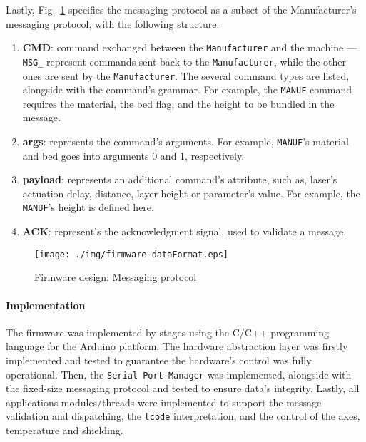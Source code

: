 Lastly, Fig.~\ref{fig:firmware-dataFormat} specifies the messaging protocol as a
subset of the Manufacturer's messaging protocol, with the following structure:
\begin{enumerate}
\item \textbf{CMD}: command exchanged between the \texttt{Manufacturer} and the
  machine --- \texttt{MSG\_} represent commands sent back to the
  \texttt{Manufacturer}, while the other ones are sent by the
  \texttt{Manufacturer}. 
  The several command types are listed, alongside with the command's
  grammar. For example, the \texttt{MANUF} command requires the material, the
  bed flag, and the height to be bundled in the message.
\item \textbf{args}: represents the command's arguments. For example,
  \texttt{MANUF}'s material and bed goes into arguments 0 and 1, respectively.
\item \textbf{payload}: represents an additional command's attribute, such as,
  laser's actuation delay,
  distance, layer height or parameter's value. For example, the
  \texttt{MANUF}'s height is defined here.
\item \textbf{ACK}: represent's the acknowledgment signal, used to validate a message.
\end{enumerate}

\begin{figure}[!hbt]
  \centering
    \texttt{[image: ./img/firmware-dataFormat.eps]}
  \caption{Firmware design: Messaging protocol}\label{fig:firmware-dataFormat}
\end{figure}


% 
\paragraph{Implementation}
The firmware was implemented by stages using the C/C++ programming language for
the Arduino platform. The hardware abstraction layer was firstly implemented and
tested to guarantee the hardware's control was fully operational. Then, the
\texttt{Serial Port Manager} was implemented, alongside with the fixed-size
messaging protocol and tested to ensure data's integrity. Lastly, all
applications modules/threads were implemented to support the message validation
and dispatching, the \texttt{lcode} interpretation, and the control of the axes,
temperature and shielding.


